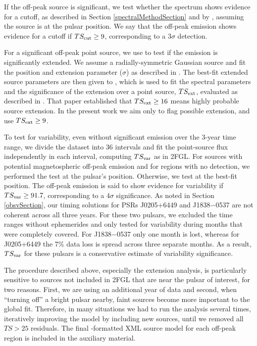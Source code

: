 If the off-peak source is significant, we test whether the spectrum shows
evidence for a cutoff, as described in Section \ref{spectralMethodSection}
and by \citet{LAT_collaboration_PWNCAT_2011}, assuming the source is at
the pulsar position.  We say that the off-peak emission shows evidence for
a cutoff if $TS_{\rm cut}\geq9$, corresponding to a $3\sigma$ detection.

For a significant off-peak point source,
we use \pointlike to test if the emission is significantly
extended.  We assume a radially-symmetric Gaussian source
and fit the position and extension parameter ($\sigma$) as described
in \citet{LAT_collaboration_extended_search_2012}.  The best-fit
extended source parameters are then given to \gtlike, which is used
to fit the spectral parameters and the significance of the extension
over a point source, $TS_{\rm ext}$, evaluated as described in
\citet{LAT_collaboration_extended_search_2012}.  
That paper established that $TS_{\rm ext}\geq16$ means highly probable source extension.
In the present work we aim only to flag possible extension, and use  $TS_{\rm ext}\geq9$.

To test for variability, even without significant emission over the 3-year time
range, we divide the dataset into 36 intervals and fit the point-source
flux independently in each interval, 
computing $TS_{\rm var}$ as in 2FGL.  
For sources with potential magnetospheric off-peak emission and for
regions with no detection, we performed the test at the pulsar's position.
Otherwise, we test at the best-fit position.
The off-peak emission is said
to show evidence for variability if $TS_{\rm var}\geq91.7$, corresponding
to a $4\sigma$ significance.  
%
As noted in Section \ref{obsvSection}, our timing solutions for PSRs J0205+6449 and J1838$-$0537 are not  
coherent across all three years.  
For these two pulsars, we excluded the time ranges without ephemerides  
and only tested for variability during months that were completely covered.  
For J1838$-$0537 only one month is lost, whereas for J0205+6449 the 7\% data loss is spread across
three separate months.
As a result, $TS_{\rm var}$ for these pulsars is a conservative estimate of variability significance.

The procedure described above, especially the extension analysis,
is particularly sensitive to sources not included in 2FGL that are near the pulsar of interest,
for two reasons.
First, we are using an additional year of data and second,
when ``turning off'' a bright pulsar nearby, faint sources become more
important to the global fit.  Therefore, in many situations we had to run
the analysis several times, iteratively improving the model by including
new sources, until we removed all $TS>25$ residuals. The final
\gtlike-formatted XML source model for each off-peak 
region is included in the auxiliary material.

